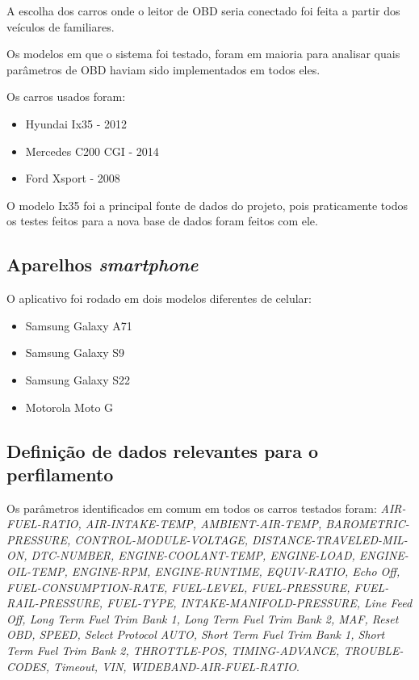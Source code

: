     A escolha dos carros onde o leitor de OBD seria conectado foi feita a partir dos veículos de familiares.

    Os modelos em que o sistema foi testado, foram em maioria para analisar quais parâmetros de OBD haviam sido implementados em todos eles.

    Os carros usados foram:

    \begin{itemize}
        \item Hyundai Ix35 - 2012
        \item Mercedes C200 CGI - 2014
        \item Ford Xsport - 2008
    \end{itemize}

    

    O modelo Ix35 foi a principal fonte de dados do projeto, pois praticamente todos os testes feitos para a nova base de dados foram feitos com ele.

    \subsection{Aparelhos \textit{smartphone}}

    O aplicativo foi rodado em dois modelos diferentes de celular:
    \begin{itemize}
        \item Samsung Galaxy A71
        \item Samsung Galaxy S9
        \item Samsung Galaxy S22
        \item Motorola Moto G
    \end{itemize}

\subsection{Definição de dados relevantes para o perfilamento}

    Os parâmetros identificados em comum em todos os carros testados foram: \textit{AIR-FUEL-RATIO, AIR-INTAKE-TEMP, AMBIENT-AIR-TEMP, BAROMETRIC-PRESSURE, CONTROL-MODULE-VOLTAGE, DISTANCE-TRAVELED-MIL-ON, DTC-NUMBER, ENGINE-COOLANT-TEMP, ENGINE-LOAD, ENGINE-OIL-TEMP, ENGINE-RPM, ENGINE-RUNTIME, EQUIV-RATIO, Echo Off, FUEL-CONSUMPTION-RATE, FUEL-LEVEL, FUEL-PRESSURE, FUEL-RAIL-PRESSURE, FUEL-TYPE, INTAKE-MANIFOLD-PRESSURE, Line Feed Off, Long Term Fuel Trim Bank 1, Long Term Fuel Trim Bank 2, MAF, Reset OBD, SPEED, Select Protocol AUTO, Short Term Fuel Trim Bank 1, Short Term Fuel Trim Bank 2, THROTTLE-POS, TIMING-ADVANCE, TROUBLE-CODES, Timeout, VIN, WIDEBAND-AIR-FUEL-RATIO}.

